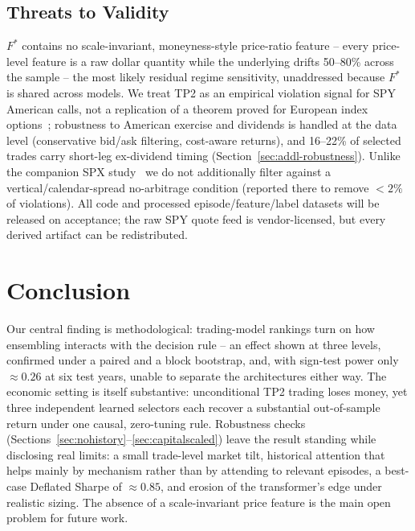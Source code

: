 \documentclass[sigconf,review,anonymous]{acmart}
\begin{document}
\subsection{Threats to Validity}
\label{sec:limitations}
$F^{\ast}$ contains no scale-invariant, moneyness-style price-ratio feature -- every price-level feature is a raw dollar quantity while the underlying drifts 50--80\% across the sample -- the most likely residual regime sensitivity, unaddressed because $F^{\ast}$ is shared across models. We treat TP2 as an empirical violation signal for SPY American calls, not a replication of a theorem proved for European index options~\cite{glasserman2026tp2theory,cosma2020earlyexercise}; robustness to American exercise and dividends is handled at the data level (conservative bid/ask filtering, cost-aware returns), and 16--22\% of selected trades carry short-leg ex-dividend timing (Section~\ref{sec:addl-robustness}). Unlike the companion SPX study~\cite{glasserman2025tp2} we do not additionally filter against a vertical/calendar-spread no-arbitrage condition (reported there to remove $<2\%$ of violations). All code and processed episode/feature/label datasets will be released on acceptance; the raw SPY quote feed is vendor-licensed, but every derived artifact can be redistributed.

\section{Conclusion}
Our central finding is methodological: trading-model rankings turn on how ensembling interacts with the decision rule -- an effect shown at three levels, confirmed under a paired and a block bootstrap, and, with sign-test power only $\approx0.26$ at six test years, unable to separate the architectures either way. The economic setting is itself substantive: unconditional TP2 trading loses money, yet three independent learned selectors each recover a substantial out-of-sample return under one causal, zero-tuning rule. Robustness checks (Sections~\ref{sec:nohistory}--\ref{sec:capitalscaled}) leave the result standing while disclosing real limits: a small trade-level market tilt, historical attention that helps mainly by mechanism rather than by attending to relevant episodes, a best-case Deflated Sharpe of $\approx0.85$, and erosion of the transformer's edge under realistic sizing. The absence of a scale-invariant price feature is the main open problem for future work.
\end{document}
